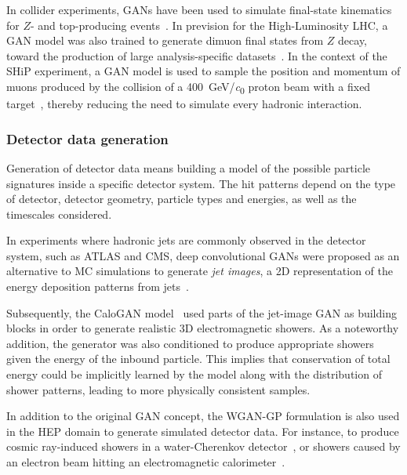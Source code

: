 In collider experiments, GANs have been used to simulate final-state kinematics for $Z$- and top-producing events~\cite{butter_how_2019, otten_event_2019}. 
In prevision for the High-Luminosity LHC, a GAN model was also trained to generate dimuon final states from $Z$ decay, toward the production of large analysis-specific datasets~\cite{hashemi2019lhc}.
In the context of the SHiP experiment, a GAN model is used to sample the position and momentum of muons produced by the collision of a \SI{400}{\GeV/\clight} proton beam with a fixed target~\cite{ahdida_fast_2019}, thereby reducing the need to simulate every hadronic interaction.


\subsubsection{Detector data generation}
Generation of detector data means building a model of the possible particle signatures inside a specific detector system. The hit patterns depend on the type of detector, detector geometry, particle types and energies, as well as the timescales considered.

In experiments where hadronic jets are commonly observed in the detector system, such as ATLAS and CMS, deep convolutional GANs were proposed as an alternative to MC simulations to generate \emph{jet images}, a 2D representation of the energy deposition patterns from jets~\cite{deOliveira2017b}. 

Subsequently, the {\sc CaloGAN} model~\cite{paganini_calogan_2018} used parts of the jet-image GAN as building blocks in order to generate realistic 3D electromagnetic showers. As a noteworthy addition, the generator was also conditioned to produce appropriate showers given the energy of the inbound particle. This implies that conservation of total energy could be implicitly learned by the model along with the distribution of shower patterns, leading to more physically consistent samples.


In addition to the original GAN concept, the WGAN-GP formulation is also used in the HEP domain to generate simulated detector data. For instance, to produce cosmic ray-induced showers in a water-Cherenkov detector~\cite{Erdmann2018}, or showers caused by an electron beam hitting an electromagnetic calorimeter~\cite{Erdmann2019}.

